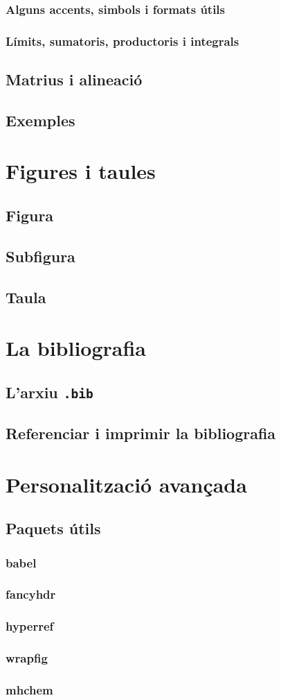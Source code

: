 \documentclass[15pt,twosides,onecolumn,openany]{book}
\begin{document}
\subsection{Alguns accents, simbols i formats útils}
\subsection{Límits, sumatoris, productoris i integrals}
\section{Matrius i alineació}
\section{Exemples}

\chapter{Figures i taules}
\section{Figura}
\section{Subfigura}
\section{Taula}
\chapter{La bibliografia}
\section{L'arxiu \texttt{.bib}}
\section{Referenciar i imprimir la bibliografia}

\chapter{Personalització avançada}
\section{Paquets útils}
\subsection{babel}
\subsection{fancyhdr}
\subsection{hyperref}
\subsection{wrapfig}
\subsection{mhchem}
\end{document}
